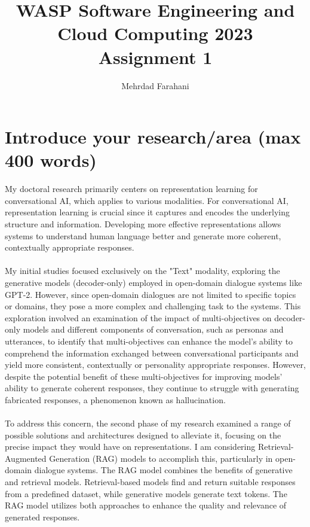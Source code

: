 \documentclass[11pt]{article}
\title{WASP Software Engineering and Cloud Computing 2023 \\ Assignment 1}
\author{Mehrdad Farahani}
\begin{document}
\maketitle

\section{Introduce your research/area (max 400 words)}
My doctoral research primarily centers on representation learning for conversational AI, which applies to various modalities. For conversational AI, representation learning is crucial since it captures and encodes the underlying structure and information. Developing more effective representations allows systems to understand human language better and generate more coherent, contextually appropriate responses. \\ \\
My initial studies focused exclusively on the "Text" modality, exploring the generative models (decoder-only) employed in open-domain dialogue systems like GPT-2. However, since open-domain dialogues are not limited to specific topics or domains, they pose a more complex and challenging task to the systems. This exploration involved an examination of the impact of multi-objectives on decoder-only models and different components of conversation, such as personas and utterances, to identify that multi-objectives can enhance the model's ability to comprehend the information exchanged between conversational participants and yield more consistent, contextually or personality appropriate responses. However, despite the potential benefit of these multi-objectives for improving models' ability to generate coherent responses, they continue to struggle with generating fabricated responses, a phenomenon known as hallucination. \\ \\
To address this concern, the second phase of my research examined a range of possible solutions and architectures designed to alleviate it, focusing on the precise impact they would have on representations. I am considering Retrieval-Augmented Generation (RAG) \cite{lewis2020retrievalaugmented} models to accomplish this, particularly in open-domain dialogue systems. The RAG model combines the benefits of generative and retrieval models. Retrieval-based models find and return suitable responses from a predefined dataset, while generative models generate text tokens. The RAG model utilizes both approaches to enhance the quality and relevance of generated responses.
\end{document}
